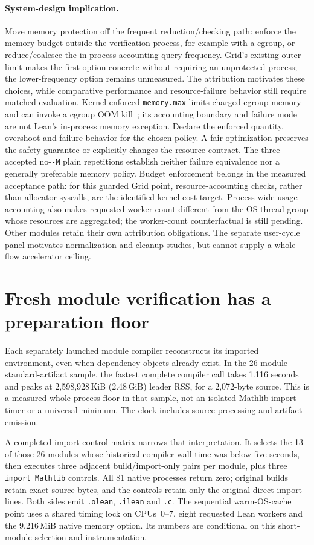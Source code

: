 \documentclass[10pt,twocolumn]{article}
\begin{document}
\paragraph{System-design implication.}
Move memory protection off the frequent reduction/checking path:
enforce the memory budget outside the verification process, for example
with a cgroup, or reduce/coalesce the in-process accounting-query frequency.
Grid's existing outer limit makes the first option concrete without
requiring an unprotected process; the lower-frequency option remains
unmeasured.
The attribution motivates these choices, while comparative performance and
resource-failure behavior still require matched evaluation.
Kernel-enforced \texttt{memory.max} limits charged cgroup memory and can
invoke a cgroup OOM kill~\cite{cgroupV2Memory2026}; its accounting boundary
and failure mode are not Lean's in-process memory exception.
Declare the enforced quantity, overshoot and failure behavior for the chosen
policy. A fair optimization preserves the safety guarantee or explicitly
changes the resource contract.
The three accepted no-\texttt{-M} plain repetitions establish neither
failure equivalence nor a generally preferable memory policy.
Budget enforcement belongs in the measured acceptance path: for this
guarded Grid point, resource-accounting checks, rather than allocator
syscalls, are the identified kernel-cost target.
Process-wide usage accounting also makes requested worker count different
from the OS thread group whose resources are aggregated; the worker-count
counterfactual is still pending.
Other modules retain their own attribution obligations.
The separate user-cycle panel motivates normalization and cleanup studies,
but cannot supply a whole-flow accelerator ceiling.


\section{Fresh module verification has a preparation floor}
\label{sec:imports}
Each separately launched module compiler reconstructs its imported
environment, even when dependency objects already exist.
In the 26-module standard-artifact sample, the fastest complete compiler
call takes 1.116 seconds and peaks at 2,598,928\,KiB
(2.48\,GiB) leader RSS, for a 2,072-byte source.
This is a measured whole-process floor in that sample, not an isolated
Mathlib import timer or a universal minimum.
The clock includes source processing and artifact emission.

A completed import-control matrix narrows that interpretation.
It selects the 13 of those 26 modules whose historical compiler wall time
was below five seconds, then executes three adjacent build/import-only
pairs per module, plus three \texttt{import Mathlib} controls.
All 81 native processes return zero; original builds retain exact source
bytes, and the controls retain only the original direct import lines.
Both sides emit \texttt{.olean}, \texttt{.ilean} and \texttt{.c}.
The sequential warm-OS-cache point uses a shared timing lock on CPUs~0--7,
eight requested Lean workers and the 9,216\,MiB native memory option.
Its numbers are conditional on this short-module selection and instrumentation.
\end{document}
